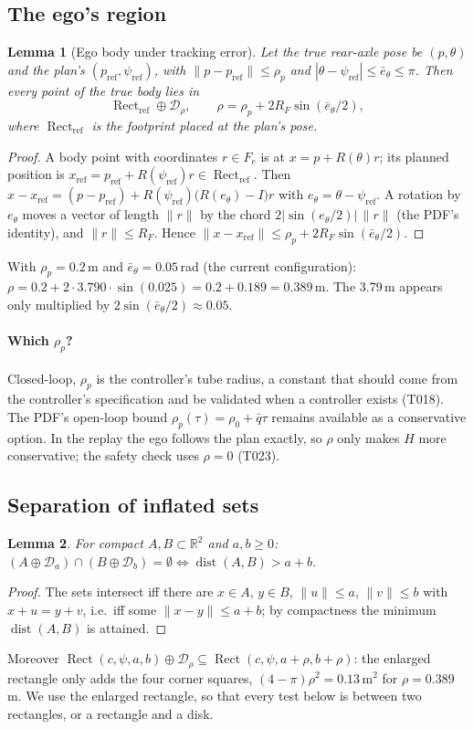 \documentclass[11pt]{article}
\newtheorem{lemma}{Lemma}
\theoremstyle{definition}
\theoremstyle{remark}
\newcommand{\R}{\mathbb{R}}
\newcommand{\Disk}{\mathcal{D}}
\newcommand{\pref}{p_{\mathrm{ref}}}
\newcommand{\psiref}{\psi_{\mathrm{ref}}}
\DeclareMathOperator{\dist}{dist}
\DeclareMathOperator{\Rect}{Rect}
\begin{document}
\subsection{The ego's region}
\begin{lemma}[Ego body under tracking error]\label{lem:ego}
Let the true rear-axle pose be $(p,\theta)$ and the plan's $(\pref,\psiref)$, with
$\|p-\pref\|\le\rho_p$ and $|\theta-\psiref|\le\bar e_\theta\le\pi$. Then every point of the true body
lies in
\[
\Rect_{\mathrm{ref}}\oplus\Disk_{\rho},\qquad \rho=\rho_p+2R_F\sin(\bar e_\theta/2),
\]
where $\Rect_{\mathrm{ref}}$ is the footprint placed at the plan's pose.
\end{lemma}
\begin{proof}
A body point with coordinates $r\in F_e$ is at $x=p+R(\theta)r$; its planned position is
$x_{\mathrm{ref}}=\pref+R(\psiref)r\in\Rect_{\mathrm{ref}}$. Then
$x-x_{\mathrm{ref}}=(p-\pref)+R(\psiref)\big(R(e_\theta)-I\big)r$ with $e_\theta=\theta-\psiref$. A rotation
by $e_\theta$ moves a vector of length $\|r\|$ by the chord $2|\sin(e_\theta/2)|\,\|r\|$ (the PDF's
identity), and $\|r\|\le R_F$. Hence $\|x-x_{\mathrm{ref}}\|\le\rho_p+2R_F\sin(\bar e_\theta/2)$.
\end{proof}
With $\rho_p=0.2$\,m and $\bar e_\theta=0.05$\,rad (the current configuration):
$\rho=0.2+2\cdot3.790\cdot\sin(0.025)=0.2+0.189=0.389$\,m. The 3.79\,m appears only multiplied by
$2\sin(\bar e_\theta/2)\approx0.05$.

\paragraph{Which $\rho_p$?} Closed-loop, $\rho_p$ is the controller's tube radius, a constant that should
come from the controller's specification and be validated when a controller exists (T018). The PDF's
open-loop bound $\rho_p(\tau)=\rho_0+\bar q\tau$ remains available as a conservative option. In the replay
the ego follows the plan exactly, so $\rho$ only makes $H$ more conservative; the safety check uses
$\rho=0$ (T023).

\subsection{Separation of inflated sets}
\begin{lemma}\label{lem:inflate}
For compact $A,B\subset\R^2$ and $a,b\ge0$:
$(A\oplus\Disk_a)\cap(B\oplus\Disk_b)=\emptyset\iff\dist(A,B)>a+b$.
\end{lemma}
\begin{proof}
The sets intersect iff there are $x\in A$, $y\in B$, $\|u\|\le a$, $\|v\|\le b$ with $x+u=y+v$, i.e.\ iff
some $\|x-y\|\le a+b$; by compactness the minimum $\dist(A,B)$ is attained.
\end{proof}
Moreover $\Rect(c,\psi,a,b)\oplus\Disk_\rho\subseteq\Rect(c,\psi,a+\rho,b+\rho)$: the enlarged rectangle
only adds the four corner squares, $(4-\pi)\rho^2=0.13\,\text{m}^2$ for $\rho=0.389$\,m. We use the
enlarged rectangle, so that every test below is between two rectangles, or a rectangle and a disk.
\end{document}
